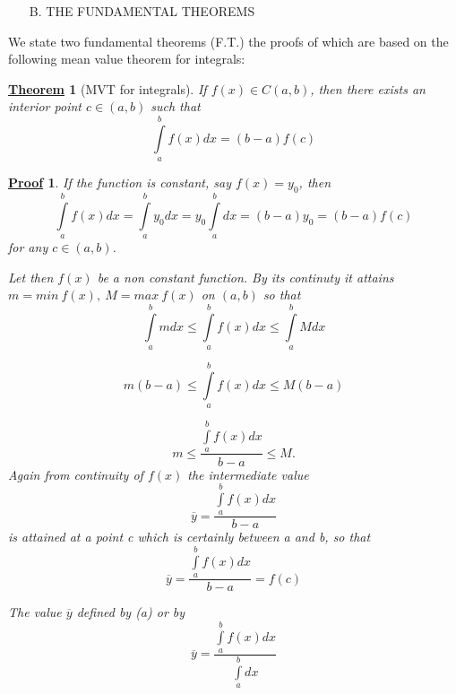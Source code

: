 \documentclass[11pt]{amsbook}
\newtheorem*{theorem}{\underline{Theorem}}
\newtheorem*{prf}{\underline{Proof}}
\begin{document}

\begin{enumerate}
	\item[B.] THE FUNDAMENTAL THEOREMS
\end{enumerate}

We state two fundamental theorems (F.T.) the proofs of which are based on the following mean value theorem for integrals:

\begin{theorem}[MVT for integrals]
If $f(x)\in C(a,b)$, then there exists an interior point $c\in (a,b)$ such that $$\int\limits_{a}^{b} f(x)dx = (b-a)f(c)$$
\end{theorem}

\begin{prf}
If the function is constant, say $f(x)=y_0$, then $$\int\limits_{a}^{b} f(x)dx=\int\limits_{a}^{b} y_0 dx=y_0 \int\limits_{a}^{b} dx=(b-a)y_0 =(b-a)f(c)$$ for any $c\in (a,b)$.

Let then $f(x)$ be a non constant function. By its continuty it attains $m=min \ f(x), \ M=max \ f(x)$ on $(a,b)$ so that $$\int\limits_a^b mdx \leq \int\limits_a^b f(x)dx \leq \int\limits_a^b Mdx$$ 

$$m(b-a) \leq \int\limits_a^b f(x)dx \leq M(b-a)$$

$$m \leq \frac{\int\limits_a^b f(x)dx}{b-a} \leq M.$$ Again from continuity of $f(x)$ the intermediate value $$\overline{y}=\frac{\int\limits_a^b f(x)dx}{b-a}$$ is attained at a point c which is certainly between a and b, so that 
\[
 \overline{y}=\frac{\int\limits_a^b f(x)dx}{b-a}=f(c) \tag{a}
\]

\par The value $\overline{y}$ defined by (a) or by $$\overline{y}=\frac{\int\limits_a^b f(x)dx}{\int\limits_a^b dx}$$
\end{prf}
\end{document}
